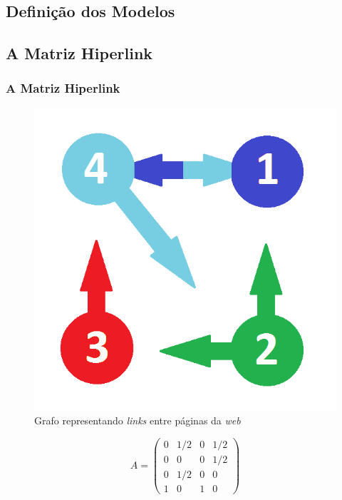 \documentclass{beamer}
\begin{document}
\begin{frame}
	\section{Definição dos Modelos}
	\subsection{A Matriz Hiperlink}
	\frametitle{A Matriz Hiperlink}

\vspace{-1cm}

\begin{figure}[!htb]
	\centering
	\includegraphics[scale=0.2]{figures/grafo}\\
	{\scriptsize Grafo representando \textit{links} entre p\'aginas da \textit{web}}
\end{figure}	

\begin{equation}
A = \begin{pmatrix}
 0 & 1/2 & 0 & 1/2 \\
 0 &  0  & 0 & 1/2 \\
 0 & 1/2 & 0 &  0  \\
 1 &  0  & 1 &  0
\end{pmatrix}
\end{equation}		
\end{frame}
\end{document}
